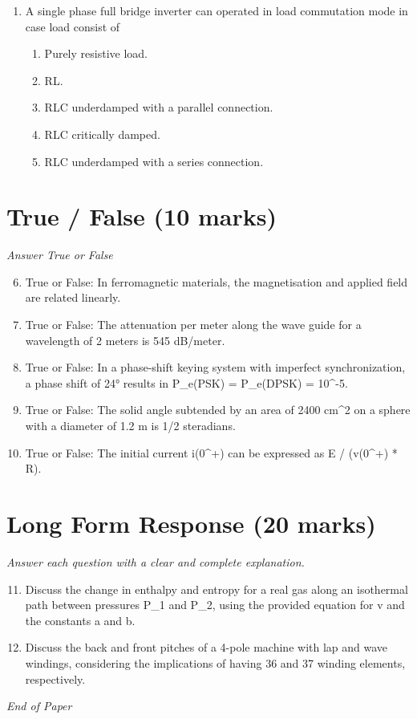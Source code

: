 \documentclass[12pt]{article}
\begin{document}
\begin{enumerate}[label=\arabic*.]
\begin{enumerate}[label=(\alph*)]
    \item (n+1)! / s\^{}n
    \item n! / s\^{}n
\end{enumerate}
\item A single phase full bridge inverter can operated in load commutation mode in case load
consist of
\begin{enumerate}[label=(\alph*)]
    \item Purely resistive load.
    \item RL.
    \item RLC underdamped with a parallel connection.
    \item RLC critically damped.
    \item RLC underdamped with a series connection.
\end{enumerate}
\end{enumerate}

\section*{True / False (10 marks)}
\textit{Answer True or False}
\begin{enumerate}[label=\arabic*.]
\setcounter{enumi}{5}
\item True or False: In ferromagnetic materials, the magnetisation and applied field are related linearly.
\item True or False: The attenuation per meter along the wave guide for a wavelength of 2 meters is 545 dB/meter.
\item True or False: In a phase-shift keying system with imperfect synchronization, a phase shift of 24° results in P\_e(PSK) = P\_e(DPSK) = 10\^{}-5.
\item True or False: The solid angle subtended by an area of 2400 cm\^{}2 on a sphere with a diameter of 1.2 m is 1/2 steradians.
\item True or False: The initial current i(0\^{}+) can be expressed as E / (v(0\^{}+) * R).
\end{enumerate}

\section*{Long Form Response (20 marks)}
\textit{Answer each question with a clear and complete explanation.}
\begin{enumerate}[label=\arabic*.]
\setcounter{enumi}{10}
\item Discuss the change in enthalpy and entropy for a real gas along an isothermal path between
pressures P\_1 and P\_2, using the provided equation for v and the constants a and b.
\item Discuss the back and front pitches of a 4-pole machine with lap and wave windings,
considering the implications of having 36 and 37 winding elements, respectively.
\end{enumerate}

\vfill
\noindent\textit{End of Paper}
\end{document}
